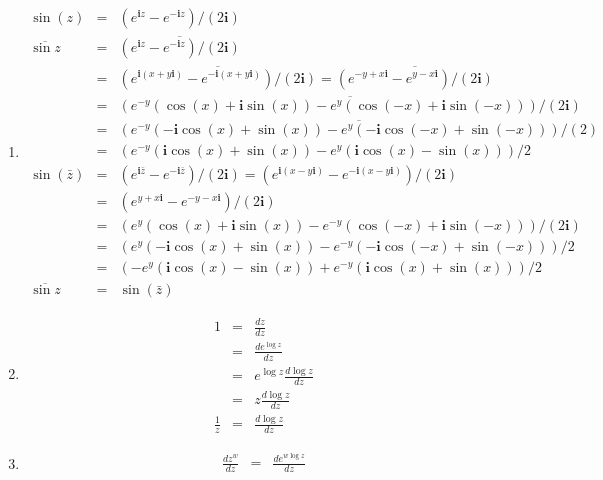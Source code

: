 \documentclass{article}%
\newcommand\I{\textbf{i}}
\newenvironment{proof}[1][]{\begin{samepage}\textbf{Proof #1} }{\rule{0.5em}{0.5em} \end{samepage}}
\begin{document}
\begin{enumerate}
\begin{enumerate}[label*=\arabic*.]
\begin{proof}[$\cos(z)$ is entire]
\begin{eqnarray*}
        \end{eqnarray*}
        \end{proof}
        \item %
        \begin{eqnarray*}
            \sin(z) &=& (e^{\I z}-e^{-\I z})/(2 \I) \\
            \overline{\sin{z}} &=& \overline{(e^{\I z}-e^{-\I z})/(2 \I)} \\
                               &=& \overline{(e^{\I(x+y\I)}-e^{-\I(x+y\I)})/(2 \I)} = \overline{(e^{-y+x\I}-e^{y-x\I})/(2 \I)} \\
                               &=& \overline{(e^{-y}(\cos(x)+\I\sin(x))-e^{y}(\cos(-x)+\I\sin(-x)))/(2\I)} \\
                               &=& \overline{(e^{-y}(-\I\cos(x)+\sin(x))-e^{y}(-\I\cos(-x)+\sin(-x)))/(2)} \\
                               &=& (e^{-y}(\I\cos(x)+\sin(x))-e^y(\I\cos(x)-\sin(x)))/2 \\
            \sin(\bar{z}) &=& (e^{\I \bar{z}}-e^{-\I \bar{z}})/(2 \I) =  (e^{\I (x-y\I)}-e^{-\I (x-y\I)})/(2 \I) \\
                          &=& (e^{y+x\I}-e^{-y-x\I})/(2 \I) \\
                          &=& (e^y(\cos(x)+\I\sin(x))-e^{-y}(\cos(-x)+\I\sin(-x)))/(2\I) \\
                          &=& (e^y(-\I\cos(x)+\sin(x))-e^{-y}(-\I\cos(-x)+\sin(-x)))/2  \\
                          &=& (-e^y(\I\cos(x)-\sin(x))+e^{-y}(\I\cos(x)+\sin(x)))/2 \\
            \overline{\sin{z}} &=& \sin(\bar{z})
        \end{eqnarray*}
        \setcounter{enumii}{50}
        \item %
        \begin{eqnarray*}
            1 &=& \frac{d z}{dz} \\
              &=& \frac{d e^{\log{z}}}{dz} \\
              &=& e^{\log{z}}\frac{d\log{z}}{dz} \\
              &=& z \frac{d\log{z}}{dz} \\
         \frac{1}{z} &=& \frac{d\log{z}}{dz}
        \end{eqnarray*}
        \setcounter{enumii}{54}
        \item %
        \begin{eqnarray*}
            \frac{d z^w}{dz} &=& \frac{d e^{w\log{z}}}{dz} \\

\end{eqnarray*}
\end{enumerate}
\end{enumerate}
\end{document}
